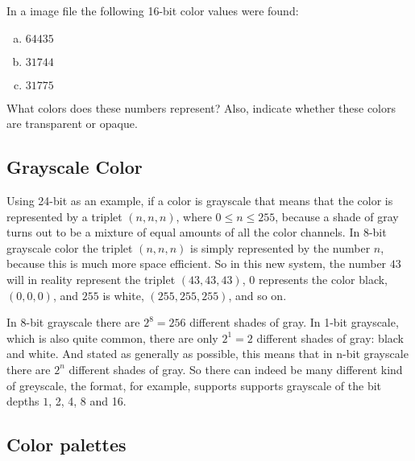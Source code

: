 \begin{Exercise}[label={tga-16-bit}]

  In a \tga image file the following 16-bit color values were found:

  \begin{enumerate}[(a)]
  \item $64435$
  \item $31744$
  \item $31775$
  \end{enumerate}

  What colors does these numbers represent? Also, indicate whether
  these colors are transparent or opaque.

\end{Exercise}

\subsection{Grayscale Color}
\label{sec:grayscale-color}

\newcommand{\selfrgbtrip}[3]{\mbox{\textcolor[RGB]{#1,#2,#3}{(#1,#2,#3)}}}
\newcommand{\selfrgbtripgray}[1]{\selfrgbtrip{#1}{#1}{#1}}

Using 24-bit as an example, if a color is grayscale that means that
the color is represented by a triplet $(n,n,n)$, where $0 \le n \le
255$, because a shade of gray turns out to be a mixture of equal
amounts of all the color channels. In 8-bit grayscale color the
triplet $(n,n,n)$ is simply represented by the number $n$, because
this is much more space efficient. So in this new system, the number
$43$ will in reality represent the triplet $(43,43,43)$, $0$
represents the color black, $(0,0,0)$, and $255$ is white,
$(255,255,255)$, and so on.

In 8-bit grayscale there are $2^8 = 256$ different shades of gray. In
1-bit grayscale, which is also quite common, there are only $2^1 = 2$
different shades of gray: black and white. And stated as generally as
possible, this means that in n-bit grayscale there are $2^n$ different
shades of gray. So there can indeed be many different kind of
greyscale, the \png format, for example, supports supports grayscale of
the bit depths $1$, 2, 4, 8 and
16\cite{boutel:_png_portab_networ_graph_specif_version12}.

\subsection{Color palettes}

